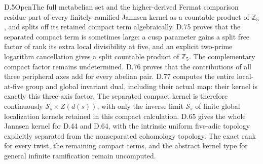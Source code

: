 \begin{statement}{D.5}{Open}{The full metabelian set and the higher-derived Fermat comparison}
residue part of every finitely ramified Jannsen
kernel as a countable product of \(\mathbb Z_5\),
and splits off its retained compact term algebraically.
D.75 proves that the separated compact term is sometimes
large: a cusp parameter gains a split free factor of rank
its extra local divisibility at five, and an explicit
two-prime logarithm cancellation gives a split countable
product of \(\mathbb Z_5\). The complementary compact
factor remains undetermined.
D.76 proves that the contributions of all three peripheral
axes add for every abelian pair. D.77 computes the entire
local-at-five group and global invariant dual, including their
actual map: their kernel is exactly this three-axis factor.
The separated compact kernel is therefore continuously
\(\mathcal S_s\times Z(d(s))\), with only the inverse limit
\(\mathcal S_s\) of finite global localization kernels
retained in this compact calculation.
D.65 gives the whole Jannsen kernel for D.44 and D.64,
with the intrinsic uniform five-adic topology
explicitly separated from the nonseparated
cohomology topology. The exact rank for every
twist, the remaining compact terms, and the
abstract kernel type for general infinite
ramification remain uncomputed.


\end{statement}
